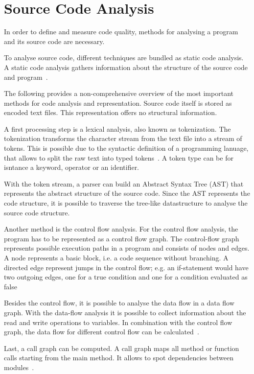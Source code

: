 \section{Source Code Analysis}\label{sec:code_analysis}
In order to define and measure code quality, methods for analysing a program and its source code are necessary.

To analyse source code, different techniques are bundled as static code analysis. A static code analysis gathers information about the structure of the source code and program~\cite{prahofer_static_2017}.

The following provides a non-comprehensive overview of the most important methods for code analysis and representation.
Source code itself is stored as encoded text files. This representation offers no structural information. 

A first processing step is a lexical analysis, also known as tokenization. The tokenization transforms the character stream from the text file into a stream of tokens. This is possible due to the syntactic definition of a programming lanuage, that allows to split the raw text into typed tokens~\cite{mogensen_introduction_2017}. A token type can be for isntance a keyword, operator or an identifier.

With the token stream, a parser can build an Abstract Syntax Tree (AST) that represents the abstract structure of the source code.
Since the AST represents the code structure, it is possible to traverse the tree-like datastructure to analyse the source code structure.

Another method is the control flow analysis. For the control flow analysis, the program has to be represented as a control flow graph. The control-flow graph represents possible execution paths in a program and consists of nodes and edges. A node represents a basic block, i.e. a code sequence without branching. A directed edge represent jumps in the control flow; e.g. an if-statement would have two outgoing edges, one for a true condition and one for a condition evaluated as false~\cite{allen_control_1970}

Besides the control flow, it is possible to analyse the data flow in a data flow graph. With the data-flow analysis it is possible to collect information about the read and write operations to variables. In combination with the control flow graph, the data flow for different control flow can be calculated~\cite{mogensen_introduction_2017}.

Last, a call graph can be computed. A call graph maps all method or function calls starting from the main method. It allows to spot dependencies between modules~\cite{prahofer_static_2017}.

